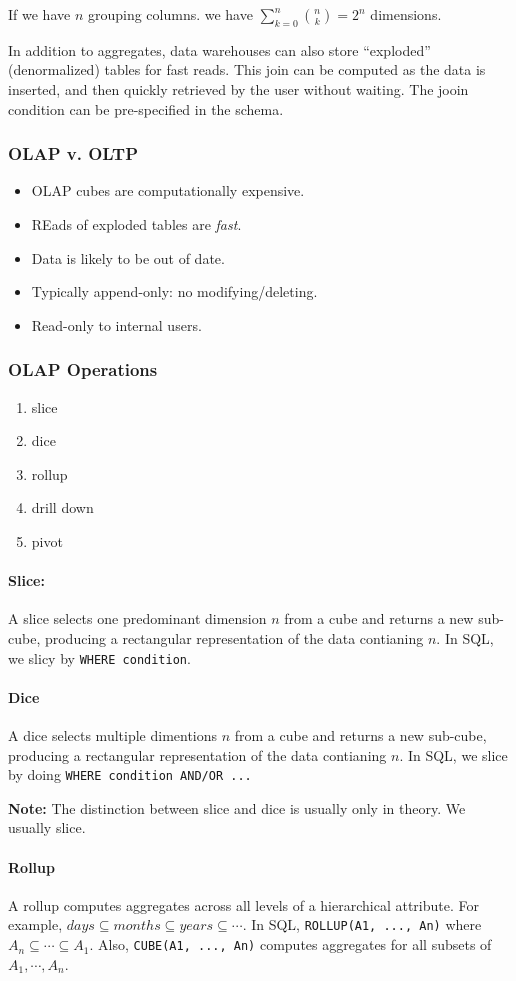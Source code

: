 \documentclass{report}
\renewcommand{\bf}[1]{\textbf{{#1}}}
\renewcommand{\tt}[1]{\texttt{{#1}}}
\renewcommand{\it}[1]{\textit{{#1}}}
\begin{document}
If we have $n$ grouping columns. we have $ \sum_{k = 0}^n \binom{n}{k} = 2^n $ dimensions.
\vspace{1em}

In addition to aggregates, data warehouses can also store ``exploded'' (denormalized) tables for
fast reads. This join can be computed as the data is inserted, and then quickly retrieved by the
user without waiting. The jooin condition can be pre-specified in the schema.


\subsubsection{OLAP v. OLTP}
\begin{itemize}[label=$\to$]
    \item OLAP cubes are computationally expensive.
    \item REads of exploded tables are \it{fast}.
    \item Data is likely to be out of date.
    \item Typically append-only: no modifying/deleting.
    \item Read-only to internal users.
\end{itemize}

\subsubsection{OLAP Operations}
\begin{enumerate}
    \item slice
    \item dice
    \item rollup
    \item drill down
    \item pivot
\end{enumerate}

\paragraph{Slice:} A slice selects one predominant dimension $n$ from a cube and returns a new 
sub-cube, producing a rectangular representation of the data contianing $n$. In SQL, we slicy by
\tt{WHERE condition}.

\paragraph{Dice} A dice selects multiple dimentions $n$ from a cube and returns a new 
sub-cube, producing a rectangular representation of the data contianing $n$. In SQL, we slice by
doing \tt{WHERE condition AND/OR ...}

\bf{Note:} The distinction between slice and dice is usually only in theory. We usually slice.


\paragraph{Rollup} A rollup computes aggregates across all levels of a hierarchical attribute.
For example, $days \subseteq months \subseteq years \subseteq \cdots$. In SQL,
\tt{ROLLUP(A1, ..., An)} where $A_n \subseteq \cdots \subseteq A_1$. Also,
\tt{CUBE(A1, ..., An)} computes aggregates for all subsets of $A_1, \cdots, A_n$.
\end{document}
